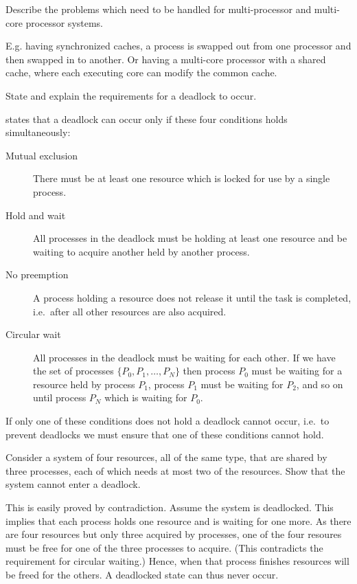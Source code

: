 \documentclass[a4paper,nocourse]{miunasgn}
\begin{document}
\begin{questions}
	\question\label{q:multicore}
	Describe the problems which need to be handled for multi-processor and 
	multi-core processor systems.
	\begin{solution}
		E.g. having synchronized caches, a process is swapped out from one 
		processor and then swapped in to another.
		Or having a multi-core processor with a shared cache, where each executing 
		core can modify the common cache.
	\end{solution}


	\question\label{q:deadlock}
	State and explain the requirements for a deadlock to occur.
	\begin{solution}
		\citet[pp. 285--287]{Silberschatz2009osc} states that a deadlock can occur 
		only if these four conditions holds simultaneously:
		\begin{description}
			\item[Mutual exclusion] There must be at least one resource which is 
				locked for use by a single process.
			\item[Hold and wait] All processes in the deadlock must be holding at 
				least one resource and be waiting to acquire another held by another 
				process.
			\item[No preemption] A process holding a resource does not release it 
				until the task is completed, i.e.\ after all other resources are also 
				acquired.
			\item[Circular wait] All processes in the deadlock must be waiting for 
				each other.
				If we have the set of processes \(\{P_0, P_1, \ldots, P_N\}\) then
				process \(P_0\) must be waiting for a resource held by process \(P_1\), 
				process \(P_1\) must be waiting for \(P_2\), and so on until process 
				\(P_N\) which is waiting for \(P_0\).
		\end{description}
		If only one of these conditions does not hold a deadlock cannot occur, i.e.\  
		to prevent deadlocks we must ensure that one of these conditions cannot 
		hold.
	\end{solution}

	\question\label{q:deadlockfree}
	Consider a system of four resources, all of the same type, that are shared by 
	three processes, each of which needs at most two of the resources.
	Show that the system cannot enter a deadlock.
	\begin{solution}
		This is easily proved by contradiction.
		Assume the system is deadlocked.
		This implies that each process holds one resource and is waiting for one 
		more.
		As there are four resources but only three acquired by processes, one of 
		the four resoures must be free for one of the three processes to acquire.
		(This contradicts the requirement for circular waiting.)
		Hence, when that process finishes resources will be freed for the others.
		A deadlocked state can thus never occur.
	\end{solution}


\end{questions}
\end{document}
